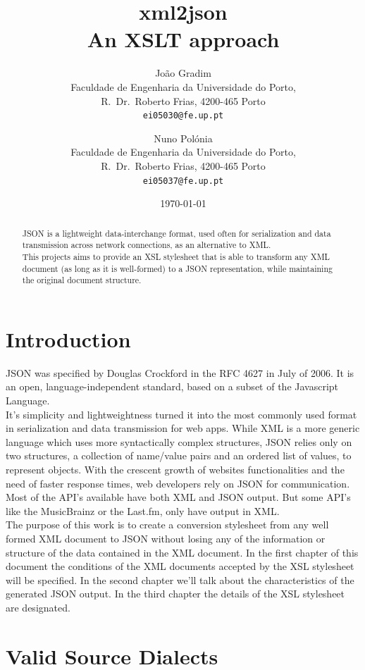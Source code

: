 \documentclass[twocolumn,twoside,10pt,a4paper]{article}
\title{xml2json\\\footnotesize{An XSLT approach}}
\author{João Gradim\\
\small Faculdade de Engenharia da Universidade do Porto,\\[-0.8ex]
\small R.\ Dr.\ Roberto Frias, 4200-465 Porto\\[-0.8ex]
\small \texttt{ei05030@fe.up.pt}\\
\and
Nuno Polónia\\
\small Faculdade de Engenharia da Universidade do Porto,\\[-0.8ex]
\small R.\ Dr.\ Roberto Frias, 4200-465 Porto\\[-0.8ex]
\small \texttt{ei05037@fe.up.pt}
}
\date{\today}
\begin{document}
\maketitle
\thispagestyle{plain}

\begin{abstract}

JSON is a lightweight data-interchange format, used often for serialization and data transmission across network connections, as an alternative to XML\cite{json_format}.\\
This projects aims to provide an XSL stylesheet that is able to transform any XML document (as long as it is well-formed) to a JSON representation, while maintaining the original document structure.

\end{abstract}
\section{Introduction}\label{sec:intro}


JSON was specified by Douglas Crockford in the RFC 4627 in July of 2006\cite{rfc4627}. It is an open, language-independent standard, based on a subset of the Javascript Language.\\
It's simplicity and lightweightness turned it into the most commonly used format in serialization and data transmission for web apps. While XML is a more generic language which uses more syntactically complex structures, JSON relies only on two structures, a collection of name/value pairs and an ordered list of values\cite{json_format}, to represent objects.
With the crescent growth of websites functionalities and the need of faster response times, web developers rely on JSON for communication. Most of the API's available have both XML and JSON output. But some API's like the MusicBrainz or the Last.fm, only have output in XML.\\
The purpose of this work is to create a conversion stylesheet from any well formed XML document to JSON without losing any of the information or structure of the data contained in the XML document. In the first chapter of this document the conditions of the XML documents accepted by the XSL stylesheet will be specified. In the second chapter we'll talk about the characteristics of the generated JSON output. In the third chapter the details of the XSL stylesheet are designated.

\section{Valid Source Dialects}\label{sec:valid-source-dialects}
\end{document}
